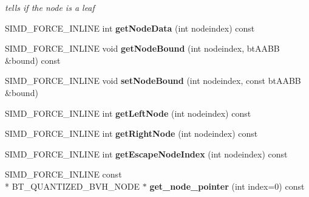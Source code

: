 \begin{DoxyCompactItemize}
\begin{DoxyCompactList}\small\item\em tells if the node is a leaf \end{DoxyCompactList}\item 
\hypertarget{classbt_quantized_bvh_tree_a0a61c2c44f1d8624fc658c6afac82730}{S\+I\+M\+D\+\_\+\+F\+O\+R\+C\+E\+\_\+\+I\+N\+L\+I\+N\+E int {\bfseries get\+Node\+Data} (int nodeindex) const }\label{classbt_quantized_bvh_tree_a0a61c2c44f1d8624fc658c6afac82730}

\item 
\hypertarget{classbt_quantized_bvh_tree_a7a3c251f8f7a0634443075c3f2c9d3ce}{S\+I\+M\+D\+\_\+\+F\+O\+R\+C\+E\+\_\+\+I\+N\+L\+I\+N\+E void {\bfseries get\+Node\+Bound} (int nodeindex, bt\+A\+A\+B\+B \&bound) const }\label{classbt_quantized_bvh_tree_a7a3c251f8f7a0634443075c3f2c9d3ce}

\item 
\hypertarget{classbt_quantized_bvh_tree_ad2904559dc545e9839112486d97fbe17}{S\+I\+M\+D\+\_\+\+F\+O\+R\+C\+E\+\_\+\+I\+N\+L\+I\+N\+E void {\bfseries set\+Node\+Bound} (int nodeindex, const bt\+A\+A\+B\+B \&bound)}\label{classbt_quantized_bvh_tree_ad2904559dc545e9839112486d97fbe17}

\item 
\hypertarget{classbt_quantized_bvh_tree_a21737bca2fa75357d8df6212c63ed473}{S\+I\+M\+D\+\_\+\+F\+O\+R\+C\+E\+\_\+\+I\+N\+L\+I\+N\+E int {\bfseries get\+Left\+Node} (int nodeindex) const }\label{classbt_quantized_bvh_tree_a21737bca2fa75357d8df6212c63ed473}

\item 
\hypertarget{classbt_quantized_bvh_tree_af057708d27b518c7a71e75e092a049c7}{S\+I\+M\+D\+\_\+\+F\+O\+R\+C\+E\+\_\+\+I\+N\+L\+I\+N\+E int {\bfseries get\+Right\+Node} (int nodeindex) const }\label{classbt_quantized_bvh_tree_af057708d27b518c7a71e75e092a049c7}

\item 
\hypertarget{classbt_quantized_bvh_tree_ac8bb56e62a961eac682ac99cd04d6ad9}{S\+I\+M\+D\+\_\+\+F\+O\+R\+C\+E\+\_\+\+I\+N\+L\+I\+N\+E int {\bfseries get\+Escape\+Node\+Index} (int nodeindex) const }\label{classbt_quantized_bvh_tree_ac8bb56e62a961eac682ac99cd04d6ad9}

\item 
\hypertarget{classbt_quantized_bvh_tree_aa38b7c1ae30ff8dd77a19d1c3eba6c7e}{S\+I\+M\+D\+\_\+\+F\+O\+R\+C\+E\+\_\+\+I\+N\+L\+I\+N\+E const \\*
B\+T\+\_\+\+Q\+U\+A\+N\+T\+I\+Z\+E\+D\+\_\+\+B\+V\+H\+\_\+\+N\+O\+D\+E $\ast$ {\bfseries get\+\_\+node\+\_\+pointer} (int index=0) const }\label{classbt_quantized_bvh_tree_aa38b7c1ae30ff8dd77a19d1c3eba6c7e}

\end{DoxyCompactItemize}

